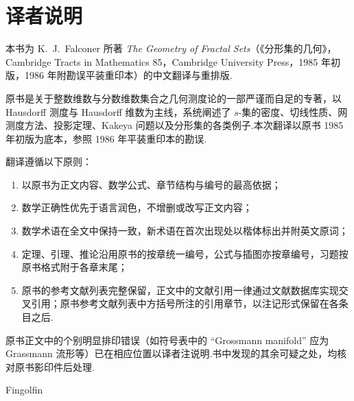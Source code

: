 
\chapter*{译者说明}

本书为 K.~J.~Falconer 所著 \emph{The Geometry of Fractal Sets}（《分形集的几何》，Cambridge Tracts in Mathematics 85，Cambridge University Press，1985 年初版，1986 年附勘误平装重印本）的中文翻译与重排版.

原书是关于整数维数与分数维数集合之几何测度论的一部严谨而自足的专著，以 Hausdorff 测度与 Hausdorff 维数为主线，系统阐述了 $s$-集的密度、切线性质、网测度方法、投影定理、Kakeya 问题以及分形集的各类例子.本次翻译以原书 1985 年初版为底本，参照 1986 年平装重印本的勘误.

翻译遵循以下原则：

\begin{enumerate}
    \item 以原书为正文内容、数学公式、章节结构与编号的最高依据；
    \item 数学正确性优先于语言润色，不增删或改写正文内容；
    \item 数学术语在全文中保持一致，新术语在首次出现处以楷体标出并附英文原词；
    \item 定理、引理、推论沿用原书的按章统一编号，公式与插图亦按章编号，习题按原书格式附于各章末尾；
    \item 原书的参考文献列表完整保留，正文中的文献引用一律通过文献数据库实现交叉引用；原书参考文献列表中方括号所注的引用章节，以注记形式保留在各条目之后.
\end{enumerate}

原书正文中的个别明显排印错误（如符号表中的 ``Grossmann manifold'' 应为 Grassmann 流形等）已在相应位置以译者注说明.书中发现的其余可疑之处，均核对原书影印件后处理.

\vspace{0.5cm}
\hfill Fingolfin

\hfill \TranslationDate
